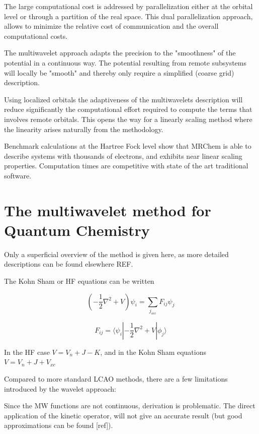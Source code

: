 \documentclass{article}
\begin{document}
The large computational cost is addressed by parallelization either at the orbital level or through a partition of the real space. This  dual parallelization approach, allows to minimize the relative cost of communication and the overall computational costs.

The multiwavelet approach adapts the precision to the "smoothness" of the potential in a continuous way. The potential resulting from remote subsystems will locally be "smooth" and thereby only require a simplified (coarse grid) description. 

Using localized orbitals the adaptiveness of the multiwavelets description will reduce significantly the computational effort required to compute the terms that involves remote orbitals. This opens the way for a linearly scaling method where the linearity arises naturally from the methodology.


Benchmark calculations at the Hartree Fock level show that MRChem is able to describe systems with thousands of electrons, and exhibits near linear scaling properties. Computation times are competitive with state of the art traditional software.


\section{The multiwavelet method for Quantum Chemistry}

Only a superficial overview of the method is given here, as more detailed descriptions can be found elsewhere REF.

The Kohn Sham or HF equations can be written

\begin{equation}
  (-\frac{1}{2}\nabla^2 + V) \psi_i = \sum_{j_{occ}} F_{ij} \psi_j
\end{equation}

\begin{equation}
  F_{ij} = \langle \psi_i |{-\frac{1}{2}\nabla^2+V}| {\phi_j}\rangle
\end{equation}

In the HF case $V=V_n+J-K$, and in the Kohn Sham equations $V=V_n+J+V_{xc}$

Compared to more standard LCAO methods, there are a few limitations introduced by the wavelet approach:

Since the  MW functions are not continuous, derivation is problematic. The direct application of the kinetic operator, will not give an accurate result (but good approximations can be found [ref]).
\end{document}
